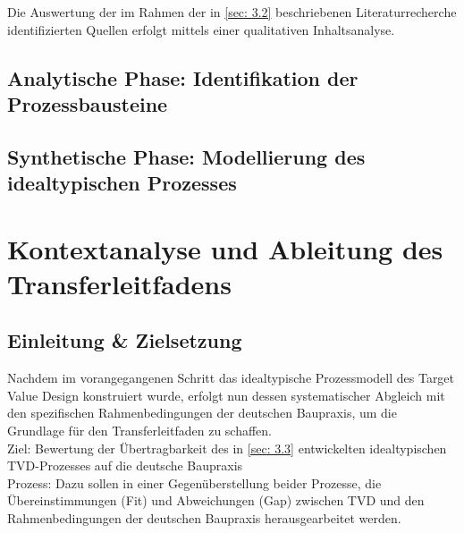 
Die Auswertung der im Rahmen der in \cref{sec: 3.2} beschriebenen Literaturrecherche identifizierten Quellen erfolgt mittels einer qualitativen Inhaltsanalyse.

\subsection{Analytische Phase: Identifikation der Prozessbausteine}
\label{sec: 3.3.1}

\subsection{Synthetische Phase: Modellierung des idealtypischen Prozesses}


\FloatBarrier
\clearpage

\section{Kontextanalyse und Ableitung des Transferleitfadens}
\label{sec: 3.4}

\subsection{Einleitung \& Zielsetzung}
\label{sec: 3.4.1}
Nachdem im vorangegangenen Schritt das idealtypische Prozessmodell des Target Value Design konstruiert wurde, erfolgt nun dessen systematischer Abgleich mit den spezifischen Rahmenbedingungen der deutschen Baupraxis, um die Grundlage für den Transferleitfaden zu schaffen.\\

Ziel: Bewertung der Übertragbarkeit des in \cref{sec: 3.3} entwickelten idealtypischen \ac{TVD}-Prozesses auf die deutsche Baupraxis\\

Prozess: Dazu sollen in einer Gegenüberstellung beider Prozesse, die Übereinstimmungen (Fit) und Abweichungen (Gap) zwischen \ac{TVD} und den Rahmenbedingungen der deutschen Baupraxis herausgearbeitet werden.\\

